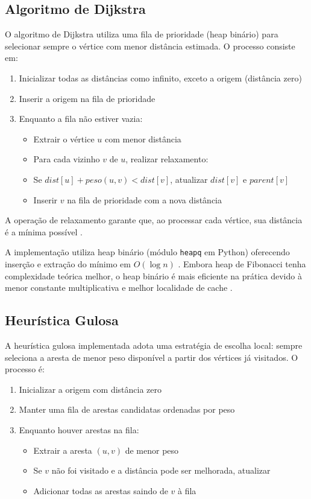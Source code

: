 \documentclass[12pt,a4paper]{article}
\begin{document}
\subsection{Algoritmo de Dijkstra}

O algoritmo de Dijkstra \cite{cormen2012, campos2010} utiliza uma fila de prioridade (heap binário) para selecionar sempre o vértice com menor distância estimada. O processo consiste em:

\begin{enumerate}
    \item Inicializar todas as distâncias como infinito, exceto a origem (distância zero)
    \item Inserir a origem na fila de prioridade
    \item Enquanto a fila não estiver vazia:
    \begin{itemize}
        \item Extrair o vértice $u$ com menor distância
        \item Para cada vizinho $v$ de $u$, realizar relaxamento:
        \item Se $dist[u] + peso(u,v) < dist[v]$, atualizar $dist[v]$ e $parent[v]$
        \item Inserir $v$ na fila de prioridade com a nova distância
    \end{itemize}
\end{enumerate}

A operação de relaxamento garante que, ao processar cada vértice, sua distância é a mínima possível \cite{cormen2012}.

A implementação utiliza heap binário (módulo \texttt{heapq} em Python) oferecendo inserção e extração do mínimo em $O(\log n)$ \cite{ziviani2013}. Embora heap de Fibonacci tenha complexidade teórica melhor, o heap binário é mais eficiente na prática devido à menor constante multiplicativa e melhor localidade de cache \cite{cormen2012}.

\subsection{Heurística Gulosa}

A heurística gulosa implementada adota uma estratégia de escolha local: sempre seleciona a aresta de menor peso disponível a partir dos vértices já visitados. O processo é:

\begin{enumerate}
    \item Inicializar a origem com distância zero
    \item Manter uma fila de arestas candidatas ordenadas por peso
    \item Enquanto houver arestas na fila:
    \begin{itemize}
        \item Extrair a aresta $(u, v)$ de menor peso
        \item Se $v$ não foi visitado e a distância pode ser melhorada, atualizar
        \item Adicionar todas as arestas saindo de $v$ à fila
    \end{itemize}
\end{enumerate}
\end{document}
